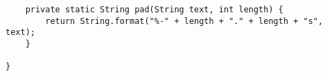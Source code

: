 \begin{lstlisting}
    private static String pad(String text, int length) {
        return String.format("%-" + length + "." + length + "s", text);
    }

}


\end{lstlisting}